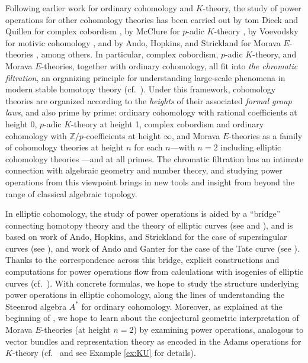\documentclass{gtpart}
\theoremstyle{definition}
\theoremstyle{remark}
\newcommand{\mb}[1]{\mathbb{#1}}
\newcommand{\BZ}{{\mb Z}}
\numberwithin{equation}{section}
\numberwithin{thm}{section}
\begin{document}
Following earlier work for ordinary cohomology and $K$-theory, the study 
of power operations for other cohomology theories has been carried out 
by tom Dieck and Quillen for complex cobordism 
\cite{tomdieck, quillenmu}, by McClure for $p$-adic $K$-theory 
\cite{mcclure, H_infty}, by Voevodsky for motivic cohomology \cite{V}, 
and by Ando, Hopkins, and Strickland for Morava $E$-theories 
\cite{AHS04}, among others.  In particular, complex cobordism, $p$-adic 
$K$-theory, and Morava $E$-theories, together with ordinary cohomology, 
all fit into {\em the chromatic filtration}, an organizing principle for 
understanding large-scale phenomena in modern stable homotopy theory 
(cf.~\cite{quillenfgl, orange, tafoverview}).  Under this framework, 
cohomology theories are organized according to the {\em heights} of 
their associated {\em formal group laws}, and also prime by prime: 
ordinary cohomology with rational coefficients at height 0, $p$-adic 
$K$-theory at height 1, complex cobordism and ordinary cohomology with 
$\BZ/p$-coefficients at height $\infty$, and Morava $E$-theories as a 
family of cohomology theories at height $n$ for each $n$---with $n = 2$ 
including elliptic cohomology theories 
\cite{morava, hopkinsmahowald, survey}---and at all primes.  The 
chromatic filtration has an intimate connection with algebraic geometry 
and number theory, and studying power operations from this viewpoint 
brings in new tools and insight from beyond the range of classical 
algebraic topology.  

In elliptic cohomology, the study of power operations is aided by a 
``bridge'' connecting homotopy theory and the theory of elliptic curves 
(see \cite[Theorem B]{cong} and \cite[Theorem 2.9.1]{KM}), and is based 
on work of Ando, Hopkins, and Strickland for the case of supersingular 
curves (see \cite{AHS04}), and work of Ando and Ganter for the case of 
the Tate curve (see \cite{Ando00, ganter}).  Thanks to the 
correspondence across this bridge, explicit constructions and 
computations for power operations flow from calculations with isogenies 
of elliptic curves (cf.~\cite{h2p2}).  With concrete formulas, we hope 
to study the structure underlying power operations in elliptic 
cohomology, along the lines of understanding the Steenrod algebra $A^*$ 
for ordinary cohomology.  Moreover, as explained at the beginning of 
\cite{Ando95}, we hope to learn about the conjectural geometric 
interpretation of Morava $E$-theories (at height $n = 2$) by examining 
power operations, analogous to vector bundles and representation theory 
as encoded in the Adams operations for $K$-theory 
(cf.~\cite{adamsvector, atiyah} and see Example \ref{ex:KU} for details).  
\end{document}
